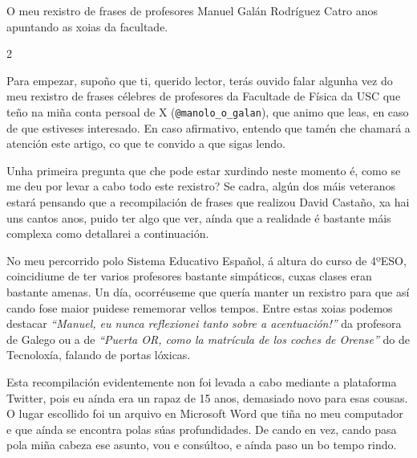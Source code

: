 \Artigo*%
{profesorado}
{O meu rexistro de frases de profesores}%
{Manuel Galán Rodríguez}%
{Catro anos apuntando as xoias da facultade.}

\noindent\begin{center}\end{center}
\vspace*{5mm}
\begin{multicols}{2}
\raggedcolumns

Para empezar, supoño que ti, querido lector, terás ouvido falar algunha vez do
meu rexistro de frases célebres de profesores da Facultade de Física da USC que
teño na miña conta persoal de X (\texttt{@manolo\_o\_galan}), que animo que
leas, en caso de que estiveses interesado. En caso afirmativo, entendo que
tamén che chamará a atención este artigo, co que te convido a que sigas lendo.

Unha primeira pregunta que che pode estar xurdindo neste momento é, como se me
deu por levar a cabo todo este rexistro? Se cadra, algún dos máis veteranos
estará pensando que a recompilación de frases que realizou David Castaño, xa
hai uns cantos anos, puido ter algo que ver, aínda que a realidade é bastante
máis complexa como detallarei a continuación.

No meu percorrido polo Sistema Educativo Español, á altura do curso de 4ºESO,
coincidiume de ter varios profesores bastante simpáticos, cuxas clases eran
bastante amenas. Un día, ocorréuseme que quería manter un rexistro para que así
cando fose maior puidese rememorar vellos tempos. Entre estas xoias podemos
destacar \textit{``Manuel, eu nunca reflexionei tanto sobre a acentuación!''}
da profesora de Galego ou a de \textit{``Puerta OR, como la matrícula de los
coches de Orense''} do de Tecnoloxía, falando de portas lóxicas.

Esta recompilación evidentemente non foi levada a cabo mediante a plataforma
Twitter, pois eu aínda era un rapaz de 15 anos, demasiado novo para esas
cousas.
O lugar escollido foi un arquivo en Microsoft Word que tiña no meu computador e
que aínda se encontra polas súas profundidades. De cando en vez, cando pasa
pola miña cabeza ese asunto, vou e consúltoo, e aínda paso un bo tempo rindo.


\end{multicols}
